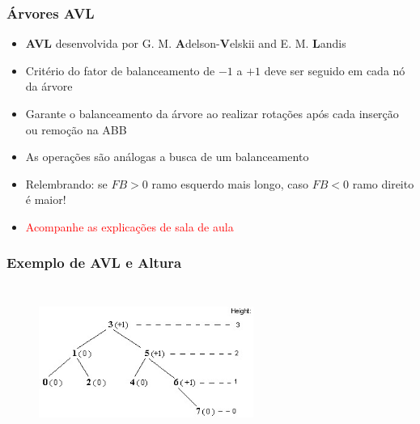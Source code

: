 \begin{frame}
    \frametitle{Árvores AVL}
    
    \begin{itemize}

    \item \textbf{AVL} desenvolvida por G. M. \textbf{A}delson-\textbf{V}elskii and E. M. \textbf{L}andis
    
    \item Critério do fator de balanceamento de $-1$ a $+1$ deve ser seguido em cada
    nó da árvore
    
    \item Garante o balanceamento da árvore ao realizar rotações após cada inserção ou remoção na ABB
    
    \item As operações são análogas a busca de um balanceamento 
    
    \item Relembrando: se $FB > 0$ ramo esquerdo mais longo, caso $FB < 0$ ramo direito é maior!
    \pause
    \item \textcolor{red}{Acompanhe as explicações de sala de aula}
    \end{itemize}
\end{frame}


\begin{frame}[fragile]
  \frametitle{Exemplo de AVL e Altura}
  
   \begin{figure}[tbp]
    \includegraphics[width=7cm, height=5cm]{figs/fig_arvores/AVL-tree-example.jpg}
    \centering
    \end{figure}

 \end{frame}



